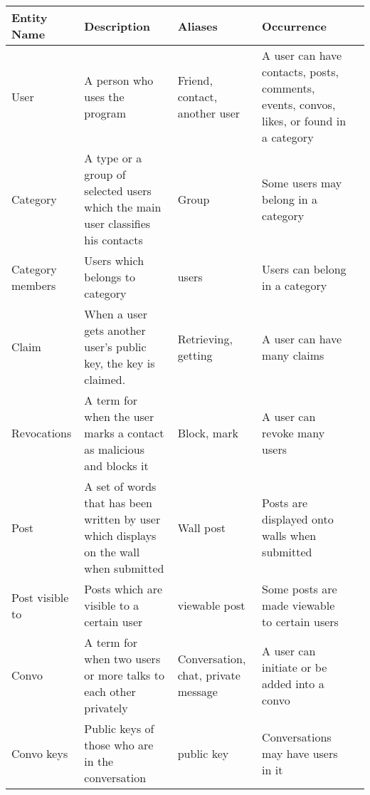 \begin{landscape}
    \begin{tabular}{| p{2cm} | p{4cm} | p{5cm} | p{7cm} | p{12cm} |}
    \hline
    Entity Name      & Description                                                                                              & Aliases                             & Occurrence                                     \\ \hline
    User             & A person who uses the program                                                                            & Friend, contact, another user       & A user can have contacts, posts, comments, events, convos, likes, or found in a category                                              \\ \hline
    Category         & A type or a group of selected users which the main user classifies his contacts        & Group                               & Some users may belong in a category           \\ \hline
    Category members & Users which belongs to category                                                        & users                             &  Users can belong in a category          \\ \hline
    Claim            & When a user gets another user's public key, the key is claimed.                        & Retrieving, getting                 & A user can have many claims                   \\ \hline
    Revocations      & A term for when the user marks a contact as malicious and blocks it                    & Block, mark                         & A user can revoke many users                  \\ \hline
    Post             & A set of words that has been written by user which displays on the wall when submitted & Wall post                           & Posts are displayed onto walls when submitted \\ \hline
    Post visible to  & Posts which are visible to a certain user  & viewable post                             & Some posts are made viewable to certain users         \\ \hline
    Convo            & A term for when two users or more talks to each other privately                        & Conversation, chat, private message & A user can initiate or be added into a convo  \\ \hline
    Convo keys       & Public keys of those who are in the conversation                                       & public key                        & Conversations may have users in it       \\ \hline
    \hline
    \end{tabular}
    

\end{landscape}
